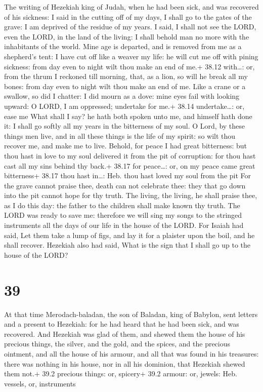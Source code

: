  The writing of Hezekiah king of Judah, when he had been
sick, and was recovered of his sickness:  I said in the
cutting off of my days, I shall go to the gates of the grave: I am
deprived of the residue of my years.  I said, I shall not
see the LORD, even the LORD, in the land of the living: I shall behold
man no more with the inhabitants of the world.  Mine age is
departed, and is removed from me as a shepherd's tent: I have cut off
like a weaver my life: he will cut me off with pining sickness: from day
even to night wilt thou make an end of me.+ 38.12 with\ldots: or, from
the thrum  I reckoned till morning, that, as a lion, so
will he break all my bones: from day even to night wilt thou make an end
of me.  Like a crane or a swallow, so did I chatter: I did
mourn as a dove: mine eyes fail with looking upward: O LORD, I am
oppressed; undertake for me.+ 38.14 undertake\ldots: or, ease me
 What shall I say? he hath both spoken unto me, and himself
hath done it: I shall go softly all my years in the bitterness of my
soul.  O Lord, by these things men live, and in all these
things is the life of my spirit: so wilt thou recover me, and make me to
live.  Behold, for peace I had great bitterness: but thou
hast in love to my soul delivered it from the pit of corruption: for
thou hast cast all my sins behind thy back.+ 38.17 for peace\ldots: or,
on my peace came great bitterness+ 38.17 thou hast in\ldots: Heb. thou
hast loved my soul from the pit  For the grave cannot
praise thee, death can not celebrate thee: they that go down into the
pit cannot hope for thy truth.  The living, the living, he
shall praise thee, as I do this day: the father to the children shall
make known thy truth.  The LORD was ready to save me:
therefore we will sing my songs to the stringed instruments all the days
of our life in the house of the LORD.  For Isaiah had said,
Let them take a lump of figs, and lay it for a plaister upon the boil,
and he shall recover.  Hezekiah also had said, What is the
sign that I shall go up to the house of the LORD?

\hypertarget{section-38}{%
\section{39}\label{section-38}}

 At that time Merodach-baladan, the son of Baladan, king of
Babylon, sent letters and a present to Hezekiah: for he had heard that
he had been sick, and was recovered.  And Hezekiah was glad
of them, and shewed them the house of his precious things, the silver,
and the gold, and the spices, and the precious ointment, and all the
house of his armour, and all that was found in his treasures: there was
nothing in his house, nor in all his dominion, that Hezekiah shewed them
not.+ 39.2 precious things: or, spicery+ 39.2 armour: or, jewels: Heb.
vessels, or, instruments

